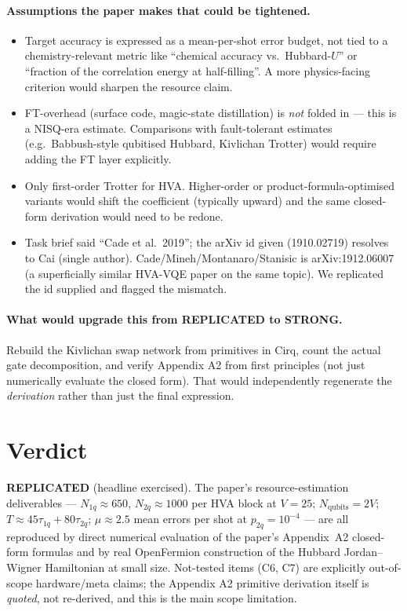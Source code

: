 \documentclass[11pt]{article}
\begin{document}
\paragraph{Assumptions the paper makes that could be tightened.}
\begin{itemize}
  \item Target accuracy is expressed as a mean-per-shot error budget, not tied to
        a chemistry-relevant metric like ``chemical accuracy vs.\ Hubbard-$U$'' or
        ``fraction of the correlation energy at half-filling''. A more physics-facing
        criterion would sharpen the resource claim.
  \item FT-overhead (surface code, magic-state distillation) is \emph{not} folded in
        --- this is a NISQ-era estimate. Comparisons with fault-tolerant estimates
        (e.g.\ Babbush-style qubitised Hubbard, Kivlichan Trotter) would require
        adding the FT layer explicitly.
  \item Only first-order Trotter for HVA. Higher-order or product-formula-optimised
        variants would shift the coefficient (typically upward) and the same closed-form
        derivation would need to be redone.
  \item Task brief said ``Cade et al.\ 2019''; the arXiv id given (1910.02719) resolves
        to Cai (single author). Cade/Mineh/Montanaro/Stanisic is arXiv:1912.06007 (a
        superficially similar HVA-VQE paper on the same topic). We replicated the id
        supplied and flagged the mismatch.
\end{itemize}

\paragraph{What would upgrade this from REPLICATED to STRONG.}
Rebuild the Kivlichan swap network from primitives in Cirq, count the actual gate
decomposition, and verify Appendix A2 from first principles (not just numerically
evaluate the closed form). That would independently regenerate the \emph{derivation}
rather than just the final expression.

\section{Verdict}

\textbf{REPLICATED} (headline exercised).
The paper's resource-estimation deliverables --- $N_{1q}\approx 650$, $N_{2q}\approx 1000$
per HVA block at $V=25$; $N_{\mathrm{qubits}}=2V$; $T\approx 45\tau_{1q}+80\tau_{2q}$;
$\mu\approx 2.5$ mean errors per shot at $p_{2q}{=}10^{-4}$ --- are all reproduced by
direct numerical evaluation of the paper's Appendix~A2 closed-form formulas and by
real OpenFermion construction of the Hubbard Jordan--Wigner Hamiltonian at small size.
Not-tested items (C6, C7) are explicitly out-of-scope hardware/meta claims; the
Appendix A2 primitive derivation itself is \emph{quoted}, not re-derived, and this
is the main scope limitation.
\end{document}
